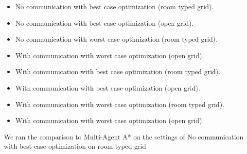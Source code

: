 \documentclass[letterpaper]{article} %
\begin{document}
{\begin{itemize}
  \item No communication with best case optimization (room typed grid). \item No communication with best case optimization (open grid).
  \item No communication with worst case optimization (room typed grid).
  \item With communication with worst case optimization (open grid).
  \item With communication with best case optimization (room typed grid).
  \item With communication with best case optimization (open grid).
  \item With communication with worst case optimization (room typed grid).
  \item With communication with worst case optimization (open grid).
\end{itemize}
We ran the comparison to Multi-Agent A* on the settings of No communication with best-case optimization on room-typed grid
}
\end{document}
